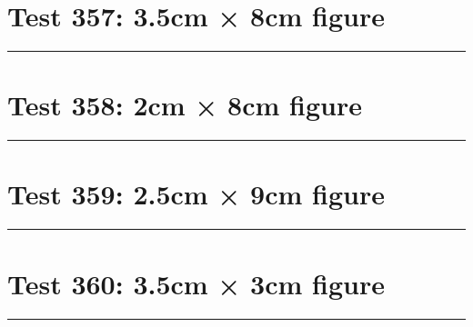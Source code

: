 \documentclass[a4paper,11pt]{article}
\begin{document}
\section*{Test 357: 3.5cm × 8cm figure}
\begin{swarmwrap}%
  \begin{minipage}[t]{3cm}
    \centering
    \rule{\linewidth}{8cm}
  \end{minipage}%
\end{swarmwrap}%
\swarmwrapnext
\lipsum[76]
\lipsum[77]
\lipsum[78]
\lipsum[79]
\lipsum[80]
\lipsum[81]
\section*{Test 358: 2cm × 8cm figure}
\begin{swarmwrap}%
  \begin{minipage}[t]{2cm}
    \centering
    \rule{\linewidth}{8cm}
  \end{minipage}%
\end{swarmwrap}%
\swarmwrapnext
\lipsum[85]
\lipsum[86]
\lipsum[87]
\section*{Test 359: 2.5cm × 9cm figure}
\begin{swarmwrap}%
  \begin{minipage}[t]{2cm}
    \centering
    \rule{\linewidth}{9cm}
  \end{minipage}%
\end{swarmwrap}%
\swarmwrapnext
\lipsum[24]
\lipsum[25]
\lipsum[26]
\lipsum[27]
\lipsum[28]
\section*{Test 360: 3.5cm × 3cm figure}
\begin{swarmwrap}%
  \begin{minipage}[t]{3cm}
    \centering
    \rule{\linewidth}{3cm}
  \end{minipage}%
\end{swarmwrap}%
\swarmwrapnext
\lipsum[113]
\lipsum[114]
\lipsum[115]
\lipsum[116]
\end{document}
